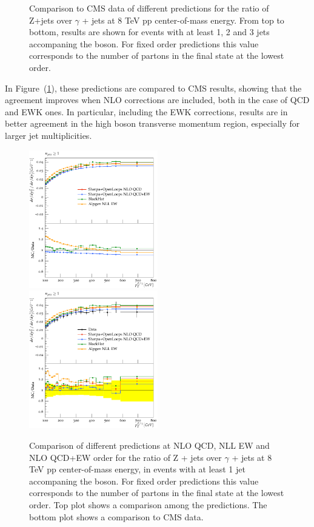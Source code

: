 \documentclass[11pt]{cernrep} \usepackage{graphicx,epsfig} 
\begin{document}
\begin{figure}
\begin{center}
 \caption{Comparison to CMS data of different predictions for the ratio of Z+jets over $\gamma$ + jets at 8 TeV pp
   center-of-mass energy. From top to bottom, results are shown for events with at least 1, 2 and 3 jets accompaning the
   boson. For fixed order predictions this value corresponds to the number of partons in the final state at the lowest order.}
\label{zgrdata}
\end{center}
\end{figure}

In Figure~(\ref{zgrdata}), these predictions are compared to CMS results, showing that the agreement improves
when NLO corrections are included, both in the case of QCD and EWK ones. In particular, including the EWK corrections,
results are in better agreement in the high boson transverse momentum region, especially for larger jet multiplicities. 

\begin{figure}
\begin{center}
\includegraphics[width=0.5\textwidth]{d07-x01-y01-SherpaOL-mc.pdf} \\
\includegraphics[width=0.5\textwidth]{d07-x01-y01-SherpaOL.pdf} \\
 \caption{Comparison of different predictions at NLO QCD,  NLL EW and NLO QCD+EW order for the 
   ratio of Z + jets over $\gamma$ + jets at 8 TeV pp
   center-of-mass energy, in events with at least 1 jet accompaning the
   boson. For fixed order predictions this value corresponds to the
   number of partons in the final state at the lowest order. Top plot
   shows a comparison among the predictions. The bottom plot shows a comparison to CMS data. } 
\label{zgrNLO}
\end{center}
\end{figure}
\end{document}
